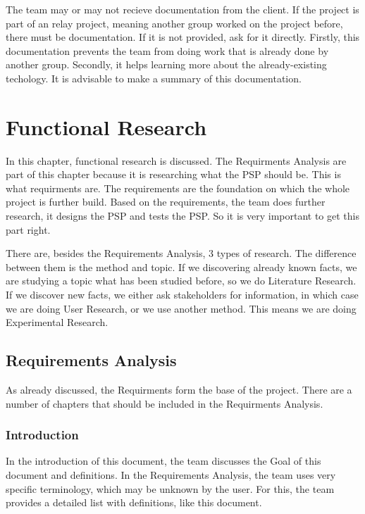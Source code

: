 \documentclass[10pt]{report}
\begin{document}
The team may or may not recieve documentation from the client. If the project is part of an relay project, meaning another group worked on the project before, there must be documentation. If it is not provided, ask for it directly. Firstly, this documentation prevents the team from doing work that is already done by another group. Secondly, it helps learning more about the already-existing techology. It is advisable to make a summary of this documentation.

\newpage


\chapter{Functional Research}
\thispagestyle{fancy}

In this chapter, functional research is discussed. The Requirments Analysis are part of this chapter because it is researching what the PSP should be. This is what requirments are. The requirements are the foundation on which the whole project is further build. Based on the requirements, the team does further research, it designs the PSP and tests the PSP. So it is very important to get this part right.

There are, besides the Requirements Analysis, 3 types of research. The difference between them is the method and topic. If we discovering already known facts, we are studying a topic what has been studied before, so we do Literature Research. If we discover new facts, we either ask stakeholders for information, in which case we are doing User Research, or we use another method. This means we are doing Experimental Research.

\medskip
\minitoc

\newpage

\section{Requirements Analysis}

As already discussed, the Requirments form the base of the project. There are a number of chapters that should be included in the Requirments Analysis.

\subsection{Introduction}

In the introduction of this document, the team discusses the Goal of this document and definitions. In the Requirements Analysis, the team uses very specific terminology, which may be unknown by the user. For this, the team provides a detailed list with definitions, like this document.
\end{document}

